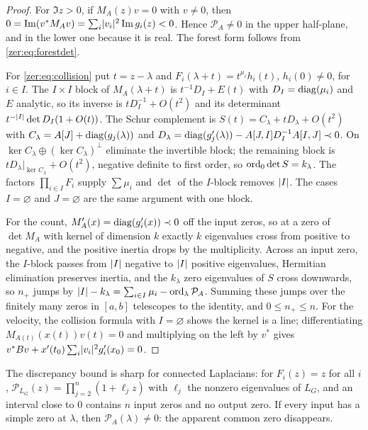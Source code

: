 \begin{proof}
For $\Im z>0$, if $M_A(z)v=0$ with $v\ne0$, then $0=\operatorname{Im}(v^*M_Av)=\sum_i\lvert v_i\rvert^2\operatorname{Im} g_i(z)<0$. Hence
$\mathcal P_A\ne0$ in the upper half-plane, and in the lower one because it is real. The forest form
follows from \eqref{zer:eq:forestdet}.

For \eqref{zer:eq:collision} put $t=z-\lambda$ and $F_i(\lambda+t)=t^{\mu_i}h_i(t)$, $h_i(0)\ne0$, for
$i\in I$. The $I\times I$ block of $M_A(\lambda+t)$ is $t^{-1}D_I+E(t)$ with $D_I=\operatorname{diag}(\mu_i)$ and $E$
analytic, so its inverse is $tD_I^{-1}+O(t^2)$ and its determinant $t^{-\lvert I\rvert}\det D_I(1+O(t))$. The
Schur complement is $S(t)=C_\lambda+tD_\lambda+O(t^2)$ with
$C_\lambda=A[J]+\operatorname{diag}(g_j(\lambda))$ and
$D_\lambda=\operatorname{diag}(g_j'(\lambda))-A[J,I]D_I^{-1}A[I,J]\prec0$. On
$\ker C_\lambda\oplus(\ker C_\lambda)^\perp$ eliminate the invertible block; the remaining block is
$tD_\lambda|_{\ker C_\lambda}+O(t^2)$, negative definite to first order, so $\operatorname{ord}_0\det S=k_\lambda$. The
factors $\prod_{i\in I}F_i$ supply $\sum\mu_i$ and $\det$ of the $I$-block removes $\lvert I\rvert$. The cases
$I=\varnothing$ and $J=\varnothing$ are the same argument with one block.

For the count, $M_A'(x)=\operatorname{diag}(g_i'(x))\prec0$ off the input zeros, so at a zero of $\det M_A$ with
kernel of dimension $k$ exactly $k$ eigenvalues cross from positive to negative, and the positive
inertia drops by the multiplicity. Across an input zero, the $I$-block passes from $\lvert I\rvert$ negative
to $\lvert I\rvert$ positive eigenvalues, Hermitian elimination preserves inertia, and the $k_\lambda$ zero
eigenvalues of $S$ cross downwards, so $n_+$ jumps by $\lvert I\rvert-k_\lambda=\sum_{i\in I}\mu_i-\operatorname{ord}_\lambda\mathcal P_A$.
Summing these jumps over the finitely many zeros in $[a,b]$ telescopes to the identity, and
$0\le n_+\le n$. For the velocity, the collision formula with $I=\varnothing$ shows the kernel is a
line; differentiating $M_{A(t)}(x(t))v(t)=0$ and multiplying on the left by $v^*$ gives
$v^*Bv+x'(t_0)\sum_i\lvert v_i\rvert^2g_i'(x_0)=0$.
\end{proof}

The discrepancy bound is sharp for connected Laplacians: for $F_i(z)=z$ for all $i$,
$\mathcal P_{L_G}(z)=\prod_{j=2}^n(1+\ell_jz)$ with $\ell_j$ the nonzero eigenvalues of $L_G$, and an
interval close to $0$ contains $n$ input zeros and no output zero. If every input has a simple zero
at $\lambda$, then $\mathcal P_A(\lambda)\ne0$: the apparent common zero disappears.

